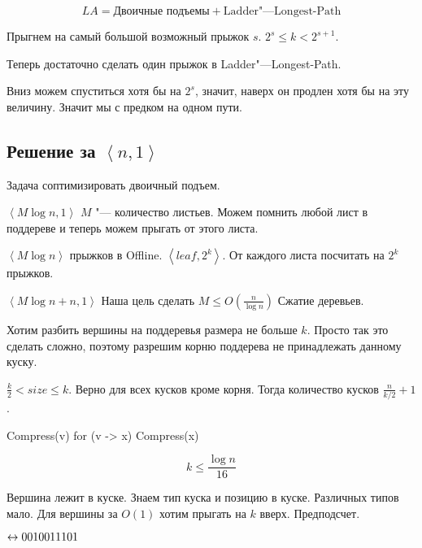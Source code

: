\[ LA = \text{Двоичные подъемы} + \text{Ladder"---Longest-Path} \]

Прыгнем на самый большой возможный прыжок $s$. $2^s \le k < 2^{s + 1}$.

Теперь достаточно сделать один прыжок в Ladder"---Longest-Path.

Вниз можем спуститься хотя бы на $2^s$, значит, наверх он продлен хотя бы на эту величину.
Значит мы с предком на одном пути.

\subsection{Решение за \texorpdfstring{$\left<n, 1\right>$}{<n, 1>}}
Задача  соптимизировать двоичный подъем.

$\left<M\log n, 1\right>$
$M$ "--- количество листьев. Можем помнить любой лист в поддереве и теперь можем прыгать от этого листа.

$\left<M\log n\right>$ прыжков в Offline. $\left<leaf, 2^k\right>$. От каждого листа посчитать на $2^k$ прыжков.

$\left<M\log n + n, 1\right>$
Наша цель сделать $M \le O(\frac{n}{\log n})$
Сжатие деревьев.


Хотим разбить вершины на поддеревья размера не больше $k$.
Просто так это сделать сложно, поэтому разрешим корню поддерева не принадлежать данному куску.

$\frac{k}{2} < size \le k$. Верно для всех кусков кроме корня.
Тогда количество кусков $\frac{n}{k/2} + 1$.


\begin{cppcode}
Compress(v) {
    for (v -> x) Compress(x)
}
\end{cppcode}

\[ k \le \frac{\log n}{16} \]

Вершина лежит в куске.
Знаем тип куска и позицию в куске.
Различных типов мало.
Для вершины за $O(1)$ хотим прыгать на $k$ вверх.
Предподсчет.


$\leftrightarrow 0010011101$
